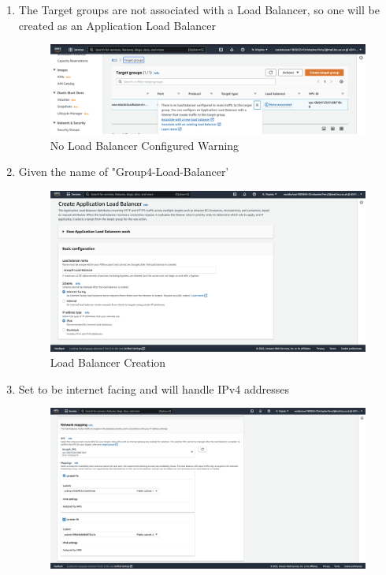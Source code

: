 \begin{enumerate}
	\item The Target groups are not associated with a Load Balancer, so one will be created as an Application Load Balancer
	      \begin{figure}[H]
	      	\centering
	      	\includegraphics[width=\textwidth]{resources/elb/elb-load-balancer-creation.png}
	      	\caption{No Load Balancer Configured Warning}
	      	\label{fig:elb-load-bal-create}
	      \end{figure}
	\item Given the name of "Group4-Load-Balancer' \begin{figure}[H]
													   \centering
													   \includegraphics[width=\textwidth]{resources/elb/elb-basic-config.png}
													   \caption{Load Balancer Creation}
													   \label{fig:elb-creation-config}
	\end{figure}
	\item Set to be internet facing and will handle IPv4 addresses \begin{figure}[H]
	      \centering
	      \includegraphics[width=\textwidth]{resources/elb/elb-network-mapping.png}

\end{figure}
\end{enumerate}
